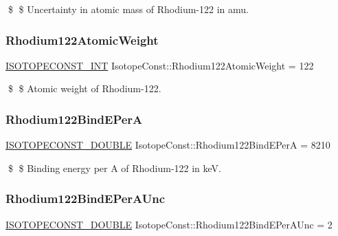 \$ \$ Uncertainty in atomic mass of Rhodium-\/122 in amu. \mbox{\label{group___isotope_const-_rhodium-_rh122_ga071eb80a4f783570efcc66f35d137780}} 
\subsubsection{\texorpdfstring{Rhodium122\+Atomic\+Weight}{Rhodium122AtomicWeight}}
{\footnotesize\ttfamily \mbox{\hyperlink{group___isotope_const-_macros_ga5f18360b3e99483a35c32d789e62621c}{I\+S\+O\+T\+O\+P\+E\+C\+O\+N\+S\+T\+\_\+\+I\+NT}} Isotope\+Const\+::\+Rhodium122\+Atomic\+Weight = 122}

\$ \$ Atomic weight of Rhodium-\/122. \mbox{\label{group___isotope_const-_rhodium-_rh122_ga1c25bc9af10432d8a59587de703e5f10}} 
\subsubsection{\texorpdfstring{Rhodium122\+Bind\+E\+PerA}{Rhodium122BindEPerA}}
{\footnotesize\ttfamily \mbox{\hyperlink{group___isotope_const-_macros_ga8f45a7272ce02c0b4c65c44636ed719a}{I\+S\+O\+T\+O\+P\+E\+C\+O\+N\+S\+T\+\_\+\+D\+O\+U\+B\+LE}} Isotope\+Const\+::\+Rhodium122\+Bind\+E\+PerA = 8210}

\$ \$ Binding energy per A of Rhodium-\/122 in keV. \mbox{\label{group___isotope_const-_rhodium-_rh122_ga95af8799a7805dabdd6c155962716e19}} 
\subsubsection{\texorpdfstring{Rhodium122\+Bind\+E\+Per\+A\+Unc}{Rhodium122BindEPerAUnc}}
{\footnotesize\ttfamily \mbox{\hyperlink{group___isotope_const-_macros_ga8f45a7272ce02c0b4c65c44636ed719a}{I\+S\+O\+T\+O\+P\+E\+C\+O\+N\+S\+T\+\_\+\+D\+O\+U\+B\+LE}} Isotope\+Const\+::\+Rhodium122\+Bind\+E\+Per\+A\+Unc = 2}

